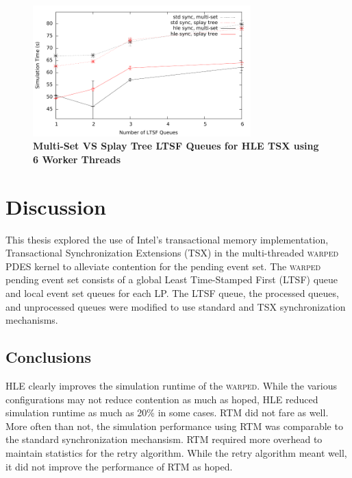 \documentclass[11pt]{book}
\begin{document}
\begin{figure}[H]
    \centering
    \graphicspath{ {./figures/} }
    \includegraphics[width=0.75\textwidth,keepaspectratio]{hugeepidemicsim-NOmig-timeVSschedQs-msVSst-6thread-hle}
\caption{\textbf{Multi-Set VS Splay Tree LTSF Queues for HLE TSX using 6 Worker Threads}}
    \label{fig:noThrMig_timeVSschq_6threads_msVSst_hle}
\end{figure}


\chapter{Discussion}

This thesis explored the use of Intel's transactional memory implementation,
Transactional Synchronization Extensions (TSX) in the multi-threaded
\textsc{warped} PDES kernel to alleviate contention for the pending event set.
The \textsc{warped} pending event set consists of a global Least Time-Stamped
First (LTSF) queue and local event set queues for each LP.  The LTSF queue, the
processed queues, and unprocessed queues were modified to use standard and TSX
synchronization mechanisms. 

\section{Conclusions}

HLE clearly improves the simulation runtime of the \textsc{warped}.  While the
various configurations may not reduce contention as much as hoped, HLE reduced
simulation runtime as much as 20\% in some cases.  RTM did not fare as well.
More often than not, the simulation performance using RTM was comparable to the
standard synchronization mechansism.  RTM required more overhead to maintain
statistics for the retry algorithm.  While the retry algorithm meant well, it
did not improve the performance of RTM as hoped.  
\end{document}

